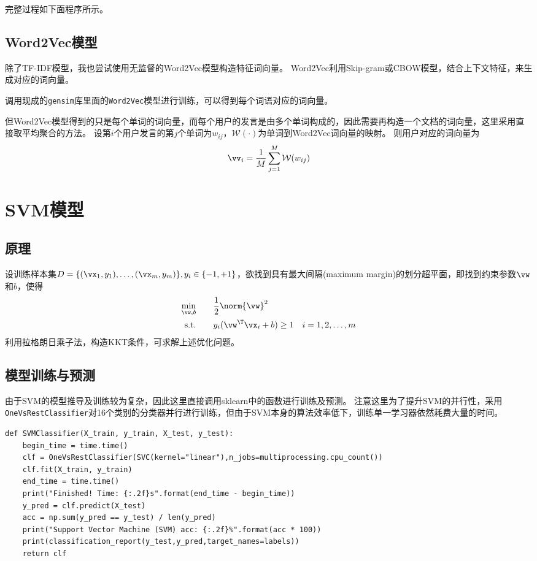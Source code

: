 \documentclass[logo,reportComp]{thesis}
\begin{document}
完整过程如下面程序所示。


\subsection{Word2Vec模型}
除了TF-IDF模型，我也尝试使用无监督的Word2Vec模型\cite{bib:word2vec}构造特征词向量。
Word2Vec利用Skip-gram或CBOW模型，结合上下文特征，来生成对应的词向量。

调用现成的\verb'gensim'库里面的\verb'Word2Vec'模型进行训练，可以得到每个词语对应的词向量。


但Word2Vec模型得到的只是每个单词的词向量，而每个用户的发言是由多个单词构成的，因此需要再构造一个文档的词向量，这里采用直接取平均聚合的方法。
设第$i$个用户发言的第$j$个单词为$w_{ij}$，$\mathcal{W}(\cdot)$为单词到Word2Vec词向量的映射。
则用户对应的词向量为
\[\vv_i=\frac{1}{M}\sum_{j=1}^M\mathcal{W}(w_{ij})\]



\section{SVM模型}
\subsection{原理}
设训练样本集$D=\{(\vx_1,y_1),\ldots,(\vx_m,y_m)\},y_i\in\{-1,+1\}$，欲找到具有最大间隔(maximum margin)的划分超平面，即找到约束参数$\vw$和$b$，使得
\[\begin{aligned}
\min_{\vw,b} & \qquad \frac{1}{2}\norm{\vw}^2\\
\text{s.t.} & \qquad y_i(\vw^\T\vx_i+b)\geq 1 & i=1,2,\ldots,m
\end{aligned}\]
利用拉格朗日乘子法，构造KKT条件，可求解上述优化问题。

\subsection{模型训练与预测}
由于SVM的模型推导及训练较为复杂，因此这里直接调用sklearn中的函数进行训练及预测。
注意这里为了提升SVM的并行性，采用\verb'OneVsRestClassifier'对16个类别的分类器并行进行训练，但由于SVM本身的算法效率低下，训练单一学习器依然耗费大量的时间。

\begin{lstlisting}
def SVMClassifier(X_train, y_train, X_test, y_test):
    begin_time = time.time()
    clf = OneVsRestClassifier(SVC(kernel="linear"),n_jobs=multiprocessing.cpu_count())
    clf.fit(X_train, y_train)
    end_time = time.time()
    print("Finished! Time: {:.2f}s".format(end_time - begin_time))
    y_pred = clf.predict(X_test)
    acc = np.sum(y_pred == y_test) / len(y_pred)
    print("Support Vector Machine (SVM) acc: {:.2f}%".format(acc * 100))
    print(classification_report(y_test,y_pred,target_names=labels))
    return clf
\end{lstlisting}
\end{document}
